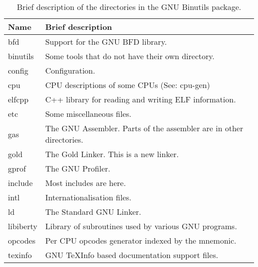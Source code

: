 \begin{table}[h]
  \centering
  \begin{tabular}[h]{|p{.1\linewidth}|p{.65\linewidth}|}
    \hline
    \textbf{Name} & \textbf{Brief description} \\
    \hline
    bfd         & Support for the GNU BFD library. \\
    binutils    & Some tools that do not have their own directory. \\
    config      & Configuration. \\                        
    cpu         & CPU descriptions of some CPUs (See: cpu-gen) \\
    elfcpp      & C++ library for reading and writing ELF information. \\
    etc         & Some miscellaneous files. \\
    gas         & The GNU Assembler.  Parts of the assembler are in other directories. \\
    gold        & The Gold Linker.  This is a new linker. \\
    gprof       & The GNU Profiler. \\
    include     & Most includes are here. \\
    intl        & Internationalisation files. \\
    ld          & The Standard GNU Linker. \\
    libiberty   & Library of subroutines used by various GNU programs. \\
    opcodes     & Per CPU opcodes generator indexed by the mnemonic. \\
    texinfo     & GNU TeXInfo based documentation support files. \\
    \hline
  \end{tabular}
  \caption[Binutils  Brief   Description]{Brief  description   of  the
    directories in the GNU Binutils package.}
  \label{tab:binutils:desc}
\end{table}

